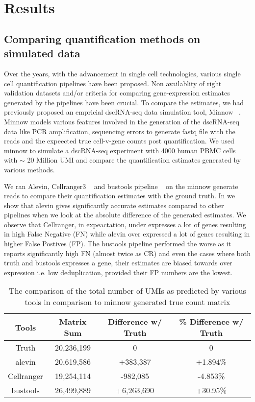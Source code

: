 \section{Results}
\subsection{Comparing quantification methods on simulated data}
\label{subsec:alv2_sims}
Over the years, with the advancement in single cell technologies, various single cell quantification 
pipelines have been proposed. Non availablity of right validation datasets and/or criteria for comparing 
gene-expression estimates generated by the pipelines have been crucial. To compare the estimates, we 
had previously proposed an empricial dscRNA-seq data simulation tool, Minnow ~\citep{sarkar2019minnow}. 
Minnow models various features involved in the generation of the dscRNA-seq data like PCR amplification, 
sequencing errors to generate fastq file with the reads and the expeected true cell-v-gene counts post 
quantification. We used minnow to simulate a dscRNA-seq experiment with 4000 human PBMC cells with $\sim$ 
20 Million UMI and compare the quantification estimates generated by various methods.

We ran Alevin, Cellranger3 ~\citep{tenx} and bustools pipeline ~\citep{melsted2019modular} on the minnow 
generate reads to compare their quantification estimates with the ground truth. 
In  we show that alevin gives significantly accurate estimates 
compared to other pipelines when we look at the absolute difference of the generated estimates. We observe 
that Cellranger, in expeactation, under expresses a lot of genes resulting in high False Negative (FN) 
while alevin over expressed a lot of genes resulting in higher False Postives (FP). 
The bustools pipeline performed the worse as it reports significantly high FN (almost twice as CR) 
and even the cases where both truth and bustools expresses a gene, their estimates are biased towards 
over expression i.e. low deduplication, provided their FP numbers are the lowest.

\begin{table}[h!]
	\centering
	 \begin{tabular}{|| c | c c c||} 
		 \hline
		 Tools & Matrix Sum & Difference w/ Truth & \% Difference w/ Truth \\ [0.5ex] 
		 \hline\hline
		 Truth & 20,236,199  & 0 & 0 \\ 
		 \hline
		 alevin & 20,619,586 & +383,387 & +1.894\% \\
		 \hline
		 Cellranger & 19,254,114 & -982,085 & -4.853\% \\
		 \hline
		 bustools & 26,499,889 & +6,263,690 & +30.95\% \\ [1ex] 
		 \hline
 	\end{tabular}
	\caption{The comparison of the total number of UMIs as predicted by various tools 
	in comparison to minnow generated true count matrix }
	\label{tab:matrix_sum}
\end{table}

